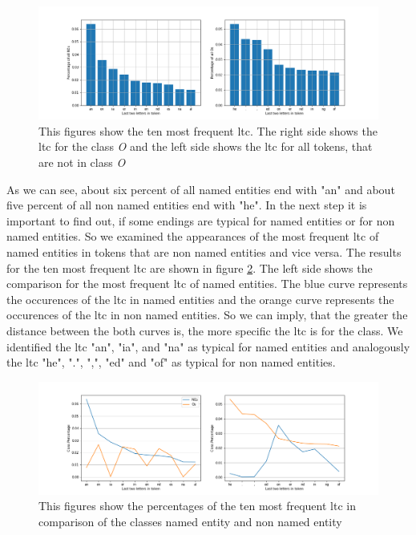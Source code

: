 \documentclass[noindent, nochapname]{tudexercise}
\begin{document}
			\begin{figure}
				\centering
				\includegraphics[scale=0.5]{img/last_two_letters_per_class.png}
				\caption{This figures show the ten most frequent ltc. The right side shows the ltc for the class \textit{O} and the left side shows the ltc for all tokens, that are not in class \textit{O}}
				\label{fig:ten_most_frequent_ltc}
			\end{figure}
			
			As we can see, about six percent of all named entities end with "an" and about five percent of all non named entities end with "he". In the next step it is important to find out, if some endings are typical for named entities or for non named entities. So we examined the appearances of the most frequent ltc of named entities in tokens that are non named entities and vice versa. The results for the ten most frequent ltc are shown in figure \ref{fig:ten_most_frequent_comparison}. The left side shows the comparison for the most frequent ltc of named entities. The blue curve represents the occurences of the ltc in named entities and the orange curve represents the occurences of the ltc in non named entities. So we can imply, that the greater the distance between the both curves is, the more specific the ltc is for the class. We identified the ltc "an", "ia", and "na" as typical for named entities and analogously the ltc "he", ".", ",", "ed" and "of" as typical for non named entities.\\
			
			\begin{figure}[h]
				\centering
				\includegraphics[scale=0.5]{img/last_two_letters_comparison.png}
				\caption{This figures show the percentages of the ten most frequent ltc in comparison of the classes named entity and non named entity}
				\label{fig:ten_most_frequent_comparison}
			\end{figure}
						
\end{document}
